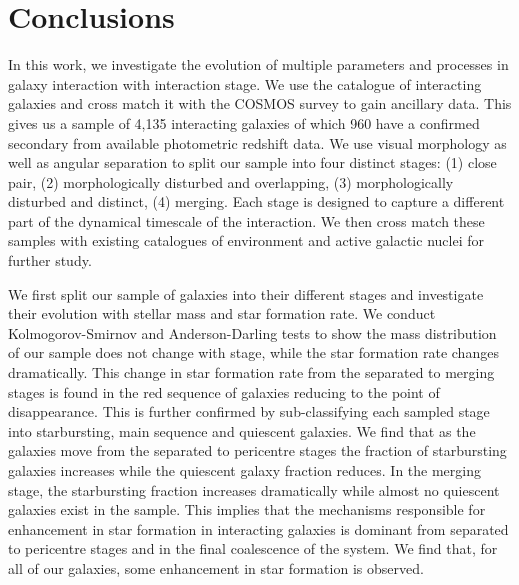 \section{Conclusions}\label{conclusion}
\noindent In this work, we investigate the evolution of multiple parameters and processes in galaxy interaction with interaction stage. We use the \citet{2023ApJ...948...40O} catalogue of interacting galaxies and cross match it with the COSMOS survey to gain ancillary data. This gives us a sample of 4,135 interacting galaxies of which 960 have a confirmed secondary from available photometric redshift data. We use visual morphology as well as angular separation to split our sample into four distinct stages: (1) close pair, (2) morphologically disturbed and overlapping, (3) morphologically disturbed and distinct, (4) merging. Each stage is designed to capture a different part of the dynamical timescale of the interaction. We then cross match these samples with existing catalogues of environment and active galactic nuclei for further study.

We first split our sample of galaxies into their different stages and investigate their evolution with stellar mass and star formation rate. We conduct Kolmogorov-Smirnov and Anderson-Darling tests to show the mass distribution of our sample does not change with stage, while the star formation rate changes dramatically. This change in star formation rate from the separated to merging stages is found in the red sequence of galaxies reducing to the point of disappearance. This is further confirmed by sub-classifying each sampled stage into starbursting, main sequence and quiescent galaxies. We find that as the galaxies move from the separated to pericentre stages the fraction of starbursting galaxies increases while the quiescent galaxy fraction reduces. In the merging stage, the starbursting fraction increases dramatically while almost no quiescent galaxies exist in the sample. This implies that the mechanisms responsible for enhancement in star formation in interacting galaxies is dominant from separated to pericentre stages and in the final coalescence of the system. We find that, for all of our galaxies, some enhancement in star formation is observed. 

